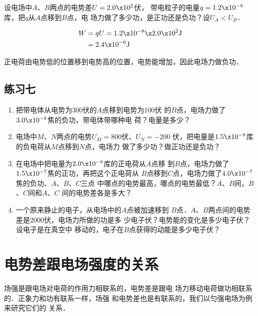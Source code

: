 \begin{example}
	设电场中$A$、$B$两点的电势差$U=2.0\x10^2$伏，
	带电粒子的电量$q=1.2\x10^{-8}$库，把$q$从$A$点移到$B$点，电
	场力做了多少功，是正功还是负功？设$U_A<U_B$．
\end{example}

\begin{solution}
\[\begin{split}
	W&=qU=1.2\x10^{-8}\x2.0\x10^2{\rm J}\\
&=2.4\x10^{-6}{\rm J}
\end{split} \]

正电荷由电势低的位置移到电势高的位置，电势能增加，因此电场力做负功．
\end{solution}

\subsection*{练习七}

\begin{enumerate}
	\item 把带电体从电势为300伏的$A$点移到电势为100伏
的$B$点，电场力做了$3.0\x10^{-8}$焦的负功，带电体带哪种电
荷？电量是多少？
\item 电场中$M$、$N$两点的电势$U_M=800$伏、$U_N=-200$
伏，把电量是$1.5\x10^{-8}$库的负电荷从$M$点移到$N$点，电场力
做了多少功？做正功还是负功？
\item 在电场中把电量为$2.0\x10^{-8}$库的正电荷从$A$点移
到$B$点，电场力做了$1.5\x10^{-7}$焦的正功，再把这个正电荷从
$B$点移到$C$点，电场力做了$4.0\x10^{-7}$焦的负功、$A$、$B$、$C$三点
中哪点的电势最高，哪点的电势最低？$A$、$B$间，$B$、$C$间和$A$、$C$
间的电势差各是多大？
\item 一个原来静止的电子，从电场中的$A$点被加速移到
$B$点．$A$、$B$两点间的电势差是2000伏，电场力所做的功是多
少电子伏？电势能的变化是多少电子伏？设电子是在真空中
移动的，电子在$B$点获得的动能是多少电子伏？
\end{enumerate}


\section{电势差跟电场强度的关系}
场强是跟电场对电荷的作用力相联系的，电势差是跟电
场力移动电荷做功相联系的．正象力和功有联系一样，场强
和电势差也是有联系的，我们以匀强电场为例来研究它们的
关系．
\begin{figure}[htp]\centering
    \caption{}
\end{figure}

